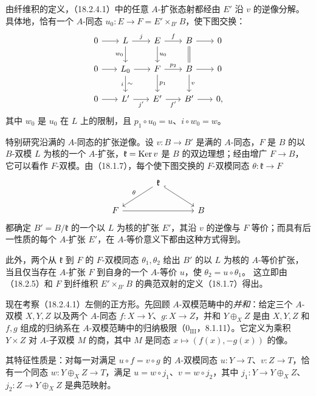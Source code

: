 由纤维积的定义，（18.2.4.1）中的任意 $A$-扩张态射都经由 $E'$ 沿 $v$ 的逆像分解。具体地，恰有一个 $A$-同态 $u_0:E\to F=E'\times_{B'}B$，使下图交换：
\[
\begin{tikzcd}[column sep=1.8em,row sep=1.9em]
0\arrow[r]&L\arrow[r,"j"]\arrow[d,"w_0"']&E\arrow[r,"f"]\arrow[d,"u_0"]&B\arrow[r]\arrow[d,equal]&0\\
0\arrow[r]&L_0\arrow[r]\arrow[d,"i"',"\sim"]&F\arrow[r,"p_2"]\arrow[d,"p_1"]&B\arrow[r]\arrow[d,"v"]&0\\
0\arrow[r]&L'\arrow[r,"j'"']&E'\arrow[r,"f'"']&B'\arrow[r]&0,
\end{tikzcd}
\]
其中 $w_0$ 是 $u_0$ 在 $L$ 上的限制，且 $p_1\circ u_0=u$、$i\circ w_0=w$。

特别研究沿满的 $A$-同态的扩张逆像。设 $v:B\to B'$ 是满的 $A$-同态，$F$ 是 $B$ 的以 $B$-双模 $L$ 为核的一个 $A$-扩张，$\mathfrak k=\operatorname{Ker} v$ 是 $B$ 的双边理想；经由增广 $F\to B$，它可以看作 $F$-双模。由（18.1.7），每个使下图交换的 $F$-双模同态 $\theta:\mathfrak k\to F$
\[
\begin{tikzcd}[column sep=large]
 &\mathfrak k\arrow[dl,"\theta"']\arrow[dr,hook]&\\
 F\arrow[rr]&&B
\end{tikzcd}
\]
都确定 $B'=B/\mathfrak k$ 的一个以 $L$ 为核的扩张 $E'$，其沿 $v$ 的逆像与 $F$ 等价；而具有后一性质的每个 $A$-扩张 $E'$，在 $A$-等价意义下都由这种方式得到。

此外，两个从 $\mathfrak k$ 到 $F$ 的 $F$-双模同态 $\theta_1,\theta_2$ 给出 $B'$ 的以 $L$ 为核的 $A$-等价扩张，当且仅当存在 $A$-扩张 $F$ 到自身的一个 $A$-等价 $u$，使 $\theta_2=u\circ\theta_1$。
这立即由（18.2.5）和 $F$ 到纤维积 $E'\times_{B'}B$ 的典范双射的定义（18.1.7）得出。

现在考察（18.2.4.1）左侧的正方形。先回顾 $A$-双模范畴中的\emph{并和}：给定三个 $A$-双模 $X,Y,Z$ 以及两个 $A$-同态 $f:X\to Y$、$g:X\to Z$，并和 $Y\oplus_X Z$ 是由 $X,Y,Z$ 和 $f,g$ 组成的归纳系在 $A$-双模范畴中的归纳极限（$0_{\mathrm{III}}$，8.1.11）。它定义为乘积 $Y\times Z$ 对 $A$-子双模 $M$ 的商，其中 $M$ 是同态 $x\mapsto(f(x),-g(x))$ 的像。

其特征性质是：对每一对满足 $u\circ f=v\circ g$ 的 $A$-双模同态 $u:Y\to T$、$v:Z\to T$，恰有一个同态 $w:Y\oplus_X Z\to T$，满足 $u=w\circ j_1$、$v=w\circ j_2$，其中 $j_1:Y\to Y\oplus_X Z$、$j_2:Z\to Y\oplus_X Z$ 是典范映射。

